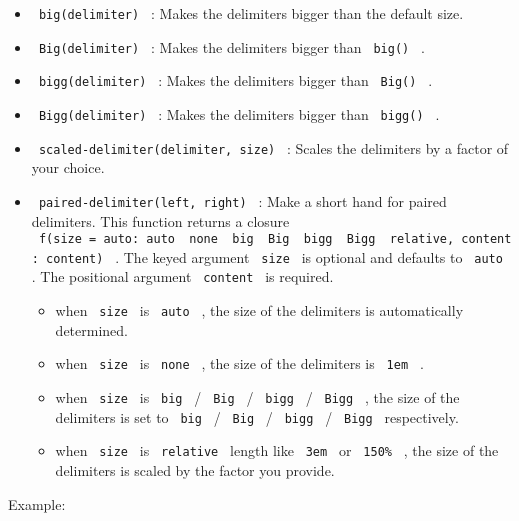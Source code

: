 \begin{itemize}
\tightlist
\item
  \texttt{\ big(delimiter)\ } : Makes the delimiters bigger than the
  default size.
\item
  \texttt{\ Big(delimiter)\ } : Makes the delimiters bigger than
  \texttt{\ big()\ } .
\item
  \texttt{\ bigg(delimiter)\ } : Makes the delimiters bigger than
  \texttt{\ Big()\ } .
\item
  \texttt{\ Bigg(delimiter)\ } : Makes the delimiters bigger than
  \texttt{\ bigg()\ } .
\item
  \texttt{\ scaled-delimiter(delimiter,\ size)\ } : Scales the
  delimiters by a factor of your choice.
\item
  \texttt{\ paired-delimiter(left,\ right)\ } : Make a short hand for
  paired delimiters. This function returns a closure
  \texttt{\ f(size\ =\ auto:\ auto\ \textbar{}\ none\ \textbar{}\ big\ \textbar{}\ Big\ \textbar{}\ bigg\ \textbar{}\ Bigg\ \textbar{}\ relative,\ content:\ content)\ }
  . The keyed argument \texttt{\ size\ } is optional and defaults to
  \texttt{\ auto\ } . The positional argument \texttt{\ content\ } is
  required.

  \begin{itemize}
  \tightlist
  \item
    when \texttt{\ size\ } is \texttt{\ auto\ } , the size of the
    delimiters is automatically determined.
  \item
    when \texttt{\ size\ } is \texttt{\ none\ } , the size of the
    delimiters is \texttt{\ 1em\ } .
  \item
    when \texttt{\ size\ } is \texttt{\ big\ } / \texttt{\ Big\ } /
    \texttt{\ bigg\ } / \texttt{\ Bigg\ } , the size of the delimiters
    is set to \texttt{\ big\ } / \texttt{\ Big\ } / \texttt{\ bigg\ } /
    \texttt{\ Bigg\ } respectively.
  \item
    when \texttt{\ size\ } is \texttt{\ relative\ } length like
    \texttt{\ 3em\ } or \texttt{\ 150\%\ } , the size of the delimiters
    is scaled by the factor you provide.
  \end{itemize}
\end{itemize}

Example:

\begin{Shaded}
\begin{Highlighting}[]

\NormalTok{$}
\NormalTok{$}
\end{Highlighting}
\end{Shaded}

